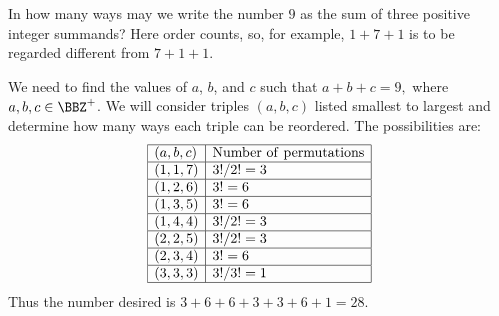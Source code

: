 \begin{exa}\label{exa:summingto9}
In how many ways may we write the number $9$ as the sum of three
positive integer summands? Here order counts, so, for example, $1 +
7 + 1$ is to be regarded different from $7 + 1 + 1$.
\begin{sol} 
We need to find the values of $a$, $b$, and $c$ such that
$a + b + c = 9,$
where $a,b,c\in\BBZ^+$.
We will consider triples $(a,b,c)$ listed smallest
to largest and determine how many ways each triple can be reordered.
The possibilities are:
$$
\begin{array}{|l|l|}\hline 
(a,b,c) & \mathrm{Number\ of\ permutations} \\
\hline (1,1,7) & 3!/2! = 3\\
\hline (1,2,6) & 3! = 6\\
\hline (1,3,5) & 3! = 6\\
\hline (1,4,4) & 3!/2!  = 3\\
\hline (2,2,5) & 3!/2!  = 3\\
\hline (2,3,4) & 3! = 6\\
\hline (3,3,3) & 3!/3!  = 1\\
\hline
\end{array}$$
Thus the number desired is $3 + 6 + 6 +3 + 3 + 6 + 1 = 28.$
\end{sol}
\end{exa}

